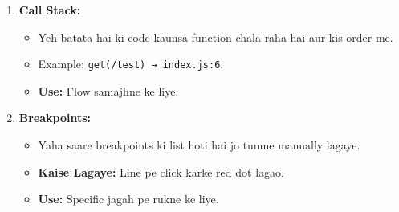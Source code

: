 \documentclass[a4paper,12pt]{article}
\begin{document}
\begin{enumerate}
    \item \textbf{\color{myblue}Call Stack:}  
    \begin{itemize}
        \item Yeh batata hai ki code kaunsa function chala raha hai aur kis order me.
        \item Example: \texttt{\color{mygreen}get(/test) → index.js:6}.
        \item \textbf{\color{myblue}Use:} Flow samajhne ke liye.
    \end{itemize}

    \item \textbf{\color{myblue}Breakpoints:}  
    \begin{itemize}
        \item Yaha saare breakpoints ki list hoti hai jo tumne manually lagaye.
        \item \textbf{\color{myblue}Kaise Lagaye:} Line pe click karke red dot lagao.
        \item \textbf{\color{myblue}Use:} Specific jagah pe rukne ke liye.
    \end{itemize}
\end{enumerate}
\end{document}
